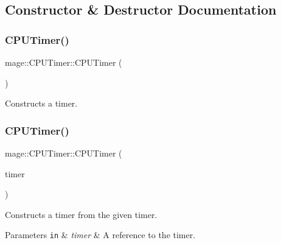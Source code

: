 \subsection{Constructor \& Destructor Documentation}
\hypertarget{classmage_1_1_c_p_u_timer_a398b1d5c99bcb09fbe37b2d74547b3e0}{}\label{classmage_1_1_c_p_u_timer_a398b1d5c99bcb09fbe37b2d74547b3e0} 
\subsubsection{\texorpdfstring{C\+P\+U\+Timer()}{CPUTimer()}\hspace{0.1cm}{\footnotesize\ttfamily [1/3]}}
{\footnotesize\ttfamily mage\+::\+C\+P\+U\+Timer\+::\+C\+P\+U\+Timer (\begin{DoxyParamCaption}{ }\end{DoxyParamCaption})}

Constructs a timer. \hypertarget{classmage_1_1_c_p_u_timer_a35d279dc760a491537099262892c62d5}{}\label{classmage_1_1_c_p_u_timer_a35d279dc760a491537099262892c62d5} 
\subsubsection{\texorpdfstring{C\+P\+U\+Timer()}{CPUTimer()}\hspace{0.1cm}{\footnotesize\ttfamily [2/3]}}
{\footnotesize\ttfamily mage\+::\+C\+P\+U\+Timer\+::\+C\+P\+U\+Timer (\begin{DoxyParamCaption}\item[{const \hyperlink{classmage_1_1_c_p_u_timer}{C\+P\+U\+Timer} \&}]{timer }\end{DoxyParamCaption})\hspace{0.3cm}{\ttfamily [default]}}

Constructs a timer from the given timer.


\begin{DoxyParams}[1]{Parameters}
\mbox{\tt in}  & {\em timer} & A reference to the timer. \\
\hline
\end{DoxyParams}
\hypertarget{classmage_1_1_c_p_u_timer_a1f416a6188d447fb24396cc4409af7aa}{}\label{classmage_1_1_c_p_u_timer_a1f416a6188d447fb24396cc4409af7aa} 
